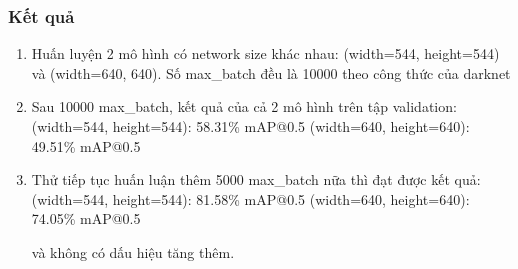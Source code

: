 \documentclass[20pt, a4paper]{article}
\begin{document}
\subsubsection{Kết quả}
\begin{enumerate}
	\item Huấn luyện 2 mô hình có network size khác nhau: (width=544, height=544) và (width=640, 640). Số max\_batch đều là 10000 theo công thức của darknet
	\item Sau 10000 max\_batch, kết quả của cả 2 mô hình trên tập validation: 
		\subitem (width=544, height=544): 58.31\% mAP@0.5
		\subitem (width=640, height=640): 49.51\% mAP@0.5
	\item Thử tiếp tục huấn luận thêm 5000 max\_batch nữa thì đạt được kết quả: 
		\subitem (width=544, height=544): 81.58\% mAP@0.5
		\subitem (width=640, height=640): 74.05\% mAP@0.5

		và không có dấu hiệu tăng thêm. 
		

\end{enumerate}
\end{document}
